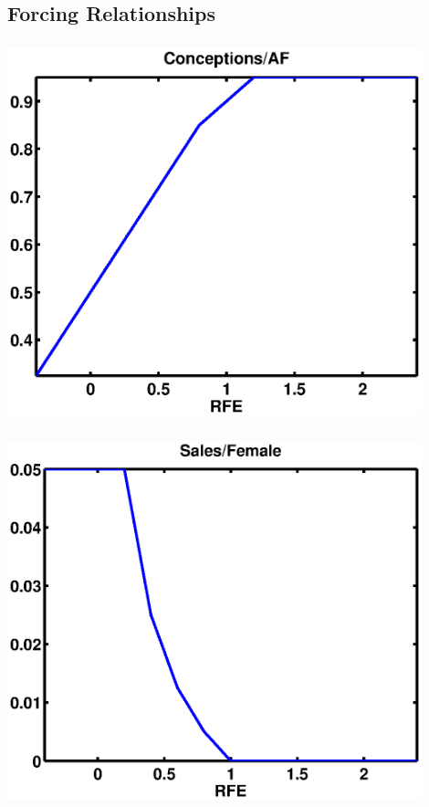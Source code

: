 \documentclass[mathserif]{beamer}
\begin{document}
\subsection{Forcing Relationships}
\begin{frame}
\begin{center}
\frametitle{\insertsubsection}
\includegraphics[width=0.9\textwidth]{conceptions}
\end{center}
\end{frame}

\begin{frame}
\begin{center}
\frametitle{\insertsubsection}
\includegraphics[width=0.9\textwidth]{salefem}
\end{center}
\end{frame}
\end{document}
